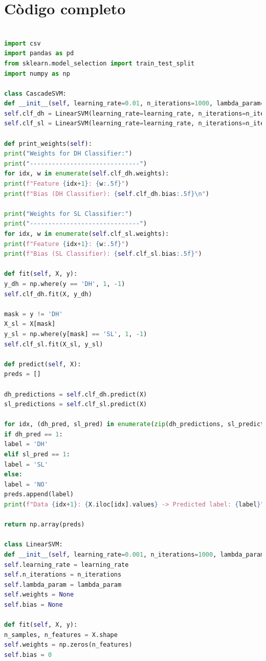 \documentclass[12pt]{article}
\begin{document}
\section{Còdigo completo}

\begin{lstlisting}[language=Python]

import csv
import pandas as pd
from sklearn.model_selection import train_test_split
import numpy as np

class CascadeSVM:
def __init__(self, learning_rate=0.01, n_iterations=1000, lambda_param=0.1):
self.clf_dh = LinearSVM(learning_rate=learning_rate, n_iterations=n_iterations, lambda_param=lambda_param)
self.clf_sl = LinearSVM(learning_rate=learning_rate, n_iterations=n_iterations, lambda_param=lambda_param)

def print_weights(self):
print("Weights for DH Classifier:")
print("------------------------------")
for idx, w in enumerate(self.clf_dh.weights):
print(f"Feature {idx+1}: {w:.5f}")
print(f"Bias (DH Classifier): {self.clf_dh.bias:.5f}\n")

print("Weights for SL Classifier:")
print("------------------------------")
for idx, w in enumerate(self.clf_sl.weights):
print(f"Feature {idx+1}: {w:.5f}")
print(f"Bias (SL Classifier): {self.clf_sl.bias:.5f}")

def fit(self, X, y):
y_dh = np.where(y == 'DH', 1, -1)
self.clf_dh.fit(X, y_dh)

mask = y != 'DH'
X_sl = X[mask]
y_sl = np.where(y[mask] == 'SL', 1, -1)
self.clf_sl.fit(X_sl, y_sl)

def predict(self, X):
preds = []

dh_predictions = self.clf_dh.predict(X)
sl_predictions = self.clf_sl.predict(X)

for idx, (dh_pred, sl_pred) in enumerate(zip(dh_predictions, sl_predictions)):
if dh_pred == 1:
label = 'DH'
elif sl_pred == 1:
label = 'SL'
else:
label = 'NO'
preds.append(label)
print(f"Data {idx+1}: {X.iloc[idx].values} -> Predicted label: {label}")

return np.array(preds)

class LinearSVM:
def __init__(self, learning_rate=0.001, n_iterations=1000, lambda_param=0.1):
self.learning_rate = learning_rate
self.n_iterations = n_iterations
self.lambda_param = lambda_param
self.weights = None
self.bias = None

def fit(self, X, y):
n_samples, n_features = X.shape
self.weights = np.zeros(n_features)
self.bias = 0


\end{lstlisting}
\end{document}
